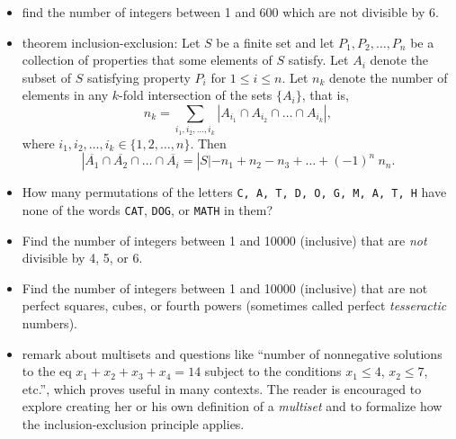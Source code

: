 \begin{itemize}
\item find the number of integers between 1 and 600 which are not divisible by 6.
\item theorem inclusion-exclusion: Let $S$ be a finite set and let $P_1, P_2, \ldots, P_n$ be a collection of properties that some elements of $S$ satisfy.  Let $A_i$ denote the subset of $S$ satisfying property $P_i$ for $1\leq i \leq n$.  Let $n_k$ denote the number of elements in any $k$-fold intersection of the sets $\{A_i\}$, that is,
$$n_k = \displaystyle \sum_{i_1, i_2, \ldots, i_k} |A_{i_1} \cap A_{i_2} \cap \ldots \cap A_{i_k}|,$$
where $i_1, i_2, \ldots, i_k \in \{1, 2, \ldots, n\}$.  Then
$$|\overline{A_1}\cap \overline{A_2}\cap \ldots \cap \overline{A_i} = |S| - n_1 + n_2 - n_3 + \ldots + (-1)^n\ n_n.$$
\item How many permutations of the letters \texttt{C, A, T, D, O, G, M, A, T, H} have none of the words \texttt{CAT}, \texttt{DOG}, or \texttt{MATH} in them?
\item Find the number of integers between 1 and 10000 (inclusive) that are \textit{not} divisible by 4, 5, or 6.
\item Find the number of integers between 1 and 10000 (inclusive) that are not perfect squares, cubes, or fourth powers (sometimes called perfect \textit{tesseractic} numbers).
\item remark about multisets and questions like ``number of nonnegative solutions to the eq $x_1 + x_2 + x_3 + x_4 = 14$ subject to the conditions $x_1 \leq 4$, $x_2 \leq 7$, etc.'', which proves useful in many contexts.  The reader is encouraged to explore creating her or his own definition of a \textit{multiset} and to formalize how the inclusion-exclusion principle applies.



\end{itemize}
